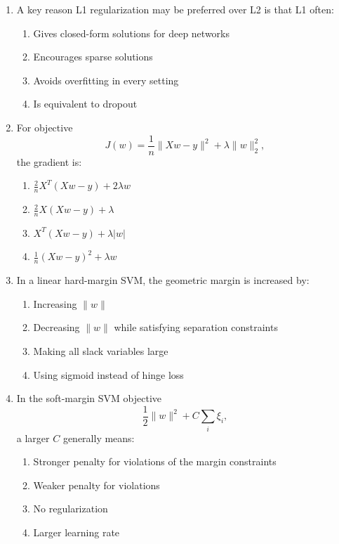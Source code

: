 \documentclass[11pt]{article}
\newcommand{\cmark}{\ding{51}}
\begin{document}
\begin{enumerate}[leftmargin=*]
\item A key reason L1 regularization may be preferred over L2 is that L1 often:

\begin{enumerate}[label=\Alph*.]
    \item Gives closed-form solutions for deep networks
    \item Encourages sparse solutions \cmark
    \item Avoids overfitting in every setting
    \item Is equivalent to dropout
\end{enumerate}

\item For objective
\[
J(w)=\frac{1}{n}\|Xw-y\|^2 + \lambda \|w\|_2^2,
\]
the gradient is:

\begin{enumerate}[label=\Alph*.]
    \item $\frac{2}{n}X^T(Xw-y)+2\lambda w$ \cmark
    \item $\frac{2}{n}X(Xw-y)+\lambda$
    \item $X^T(Xw-y)+\lambda |w|$
    \item $\frac{1}{n}(Xw-y)^2+\lambda w$
\end{enumerate}

\item In a linear hard-margin SVM, the geometric margin is increased by:

\begin{enumerate}[label=\Alph*.]
    \item Increasing $\|w\|$
    \item Decreasing $\|w\|$ while satisfying separation constraints \cmark
    \item Making all slack variables large
    \item Using sigmoid instead of hinge loss
\end{enumerate}

\item In the soft-margin SVM objective
\[
\frac{1}{2}\|w\|^2 + C\sum_i \xi_i,
\]
a larger $C$ generally means:

\begin{enumerate}[label=\Alph*.]
    \item Stronger penalty for violations of the margin constraints \cmark
    \item Weaker penalty for violations
    \item No regularization
    \item Larger learning rate
\end{enumerate}


\end{enumerate}
\end{document}
